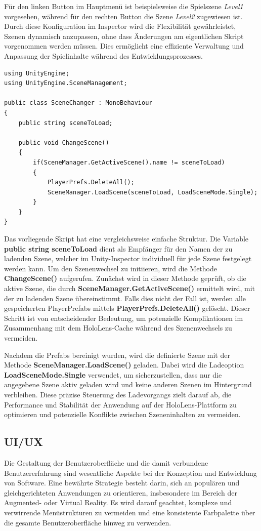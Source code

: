 Für den linken Button im Hauptmenü ist beispielsweise die Spielszene \textit{Level1} vorgesehen, während für den rechten
Button die Szene \textit{Level2} zugewiesen ist. Durch diese Konfiguration im Inspector wird die Flexibilität gewährleistet,
Szenen dynamisch anzupassen, ohne dass Änderungen am eigentlichen Skript vorgenommen werden müssen. Dies ermöglicht eine
effiziente Verwaltung und Anpassung der Spielinhalte während des Entwicklungsprozesses.

\begin{lstlisting}[style=csharp, caption=Auf Knopfdruck Szene wechseln., label=code:scenechange]
using UnityEngine;
using UnityEngine.SceneManagement;

public class SceneChanger : MonoBehaviour
{
    public string sceneToLoad;

    public void ChangeScene()
    {
        if(SceneManager.GetActiveScene().name != sceneToLoad)
        {
            PlayerPrefs.DeleteAll();
            SceneManager.LoadScene(sceneToLoad, LoadSceneMode.Single);
        }
    }
}
\end{lstlisting}

Das vorliegende Skript hat eine vergleichsweise einfache Struktur. Die Variable \textbf{public string sceneToLoad} dient
als Empfänger für den Namen der zu ladenden Szene, welcher im Unity-Inspector individuell für jede Szene festgelegt werden
kann. Um den Szenenwechsel zu initiieren, wird die Methode \textbf{ChangeScene()} aufgerufen. Zunächst wird in dieser
Methode geprüft, ob die aktive Szene, die durch \textbf{SceneManager.GetActiveScene()} ermittelt wird, mit der zu ladenden
Szene übereinstimmt. Falls dies nicht der Fall ist, werden alle gespeicherten PlayerPrefabs mittels
\textbf{PlayerPrefs.DeleteAll()} gelöscht. Dieser Schritt ist von entscheidender Bedeutung, um potenzielle Komplikationen
im Zusammenhang mit dem HoloLens-Cache während des Szenenwechsels zu vermeiden.

Nachdem die Prefabs bereinigt wurden, wird die definierte Szene mit der Methode \textbf{SceneManager.LoadScene()}
geladen. Dabei wird die Ladeoption \textbf{LoadSceneMode.Single} verwendet, um sicherzustellen, dass nur die angegebene
Szene aktiv geladen wird und keine anderen Szenen im Hintergrund verbleiben. Diese präzise Steuerung des Ladevorgangs
zielt darauf ab, die Performance und Stabilität der Anwendung auf der HoloLens-Plattform zu optimieren und potenzielle
Konflikte zwischen Szeneninhalten zu vermeiden.

\subsection{UI/UX}
Die Gestaltung der Benutzeroberfläche und die damit verbundene Benutzererfahrung sind wesentliche Aspekte bei der
Konzeption und Entwicklung von Software. Eine bewährte Strategie besteht darin, sich an populären und gleichgerichteten
Anwendungen zu orientieren, insbesondere im Bereich der Augmented- oder Virtual Reality. Es wird darauf geachtet, komplexe
und verwirrende Menüstrukturen zu vermeiden und eine konsistente Farbpalette über die gesamte Benutzeroberfläche hinweg zu verwenden.

